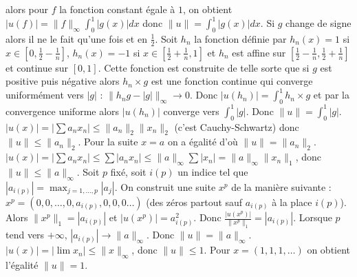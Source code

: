 {{alors pour $f$ la fonction constant égale à $1$, on obtient $| u(f) | = \| f\|_\infty \int_0^1|g(x)|dx$ donc $\| u \| = \int_0^1|g(x)|dx$.
Si $g$ change de signe alors il ne le fait qu'une fois et en $\frac 12$.
Soit $h_n$ la fonction définie par $h_n(x) = 1$ si $x\in[0,\frac 12 -\frac 1n]$,
$h_n(x) = -1$ si $x\in[\frac 12 +\frac 1n,1]$ et $h_n$ est affine sur $[\frac 12 -\frac 1n,\frac 12 +\frac 1n]$  et continue 
sur $[0,1]$. Cette fonction est construite de telle sorte que si $g$ est positive puis négative alors $h_n\times g$ est une fonction continue qui converge uniformément vers $|g|$ : $\| h_n g - |g| \|_\infty \rightarrow 0$.
Donc $| u(h_n) | = \int_0^1 h_n\times g$ 
et par la convergence uniforme alors $| u(h_n) |$ converge vers
$\int_0^1|g|$. Donc $\|u\| = \int_0^1|g|$.
$|u(x)| = |\sum a_nx_n| \le \|a_n \|_2\| x_n\|_2$ (c'est Cauchy-Schwartz)
donc $\| u \| \le \|a_n \|_2$. Pour la suite $x=a$ on a égalité d'o\`u
$\| u\| = \|a_n \|_2$.
$|u(x)| = |\sum a_nx_n| \le \sum |a_nx_n| \le \|a \|_\infty \sum |x_n| = \|a \|_\infty \| x_n\|_1$, donc $\| u \| \le \|a \|_\infty$. 
Soit $p$ fixé, soit $i(p)$ un indice tel que $|a_{i(p)}| = \max_{j=1,\ldots,p} |a_j|$.
On construit une suite $x^p$ de la manière suivante : 
$x^p = (0,0,\ldots,0,a_{i(p)},0,0,0\ldots)$ (des zéros partout sauf $a_{i(p)}$ à la place $i(p)$). Alors $\| x^p \|_1 = |a_{i(p)}|$ et $|u(x^p)| = a_{i(p)}^2$.
Donc $\frac{|u(x^p)|}{\| x^p \|_1} = | a_{i(p)}|$.
Lorsque $p$ tend vers $+\infty$, $| a_{i(p)}| \rightarrow \|a \|_\infty$.
Donc $\| u \| = \|a \|_\infty$.
$|u(x)| = |\lim x_n| \le \| x \|_\infty$, donc $\| u \| \le 1$.
Pour $x=(1,1,1,\ldots)$ on obtient l'égalité $\| u \| = 1$.
}
}
